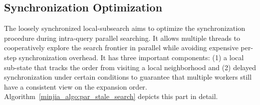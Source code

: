 

\subsection{Synchronization Optimization} 
\label{minjia_subsec:loosely_sync}

The loosely synchronized local-subsearch aims to optimize the synchronization procedure during intra-query parallel searching.
It allows multiple threads to cooperatively explore the search frontier in parallel while avoiding expensive per-step synchronization overhead. It has three important components: 
(1) a local sub-state that tracks the order from visiting a local neighborhood
and (2) delayed synchronization under certain conditions to guarantee that multiple workers still have a consistent view on the expansion order. 
Algorithm~\ref{minjia_algo:par_stale_search} depicts this part in detail. 

